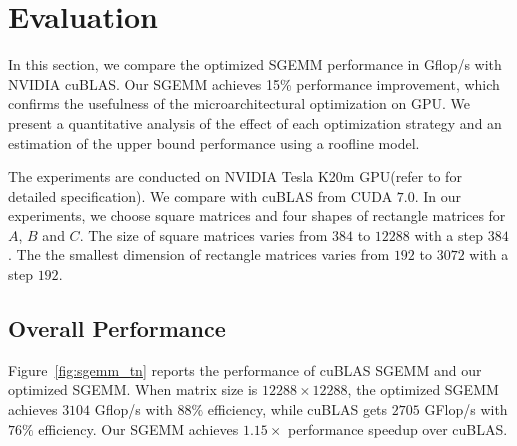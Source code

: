 \section{Evaluation}
\label{sec:experiment}

In this section, we compare the optimized SGEMM performance in Gflop/s with NVIDIA cuBLAS. 
Our SGEMM achieves 15\% %
performance
improvement, which confirms the usefulness of the microarchitectural optimization on GPU. 
We present 
a quantitative analysis of the effect of each optimization strategy and an estimation of the upper bound performance using a roofline model.

The experiments are conducted on NVIDIA Tesla K20m GPU(refer to \cite{gk110} for detailed specification). 
We compare with cuBLAS from CUDA $7.0$. In our experiments, we choose square matrices and four shapes of rectangle matrices for $A$, $B$
and $C$. The size of square matrices varies from $384$ to $12288$ with a step $384$. The the smallest dimension of rectangle matrices varies from $192$ to $3072$ with a step $192$.

\subsection{Overall Performance}
Figure~\ref{fig:sgemm_tn} reports the performance of cuBLAS SGEMM and our optimized SGEMM.
When matrix size is $12288\times12288$, the optimized SGEMM achieves $3104$
Gflop/s with $88\%$ efficiency, while cuBLAS gets $2705$ GFlop/s with $76\%$ efficiency.
Our SGEMM achieves $1.15 \times$ performance speedup over cuBLAS.%

